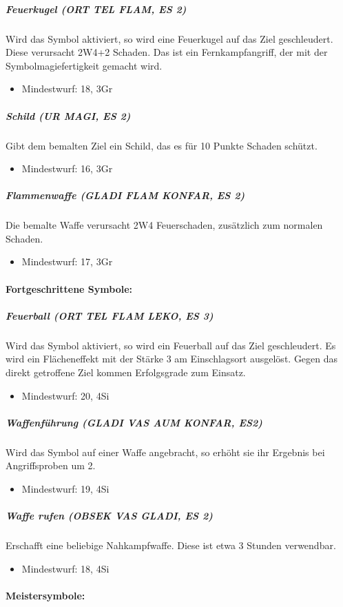 \documentclass{article}
\begin{document}
\subparagraph{Feuerkugel (ORT TEL FLAM, ES 2)}
Wird das Symbol aktiviert, so wird eine Feuerkugel auf das Ziel geschleudert. Diese verursacht 2W4+2 Schaden. Das ist ein Fernkampfangriff, der mit der Symbolmagiefertigkeit gemacht wird.
\begin{itemize}
\item Mindestwurf: 18, 3Gr
\end{itemize}

\subparagraph{Schild (UR MAGI, ES 2)}
Gibt dem bemalten Ziel ein Schild, das es für 10 Punkte Schaden schützt.
\begin{itemize}
\item Mindestwurf: 16, 3Gr
\end{itemize}

\subparagraph{Flammenwaffe (GLADI FLAM KONFAR, ES 2)}
Die bemalte Waffe verursacht 2W4 Feuerschaden, zusätzlich zum normalen Schaden.
\begin{itemize}
\item Mindestwurf: 17, 3Gr
\end{itemize}

\paragraph{Fortgeschrittene Symbole:}

\subparagraph{Feuerball (ORT TEL FLAM LEKO, ES 3)}
Wird das Symbol aktiviert, so wird ein Feuerball auf das Ziel geschleudert. Es wird ein Flächeneffekt mit der Stärke 3 am Einschlagsort ausgelöst. Gegen das direkt getroffene Ziel kommen Erfolgsgrade zum Einsatz.
\begin{itemize}
\item Mindestwurf: 20, 4Si
\end{itemize}

\subparagraph{Waffenführung (GLADI VAS AUM KONFAR, ES2)}
Wird das Symbol auf einer Waffe angebracht, so erhöht sie ihr Ergebnis bei Angriffsproben um 2.
\begin{itemize}
\item Mindestwurf: 19, 4Si
\end{itemize}

\subparagraph{Waffe rufen (OBSEK VAS GLADI, ES 2)}
Erschafft eine beliebige Nahkampfwaffe. Diese ist etwa 3 Stunden verwendbar.
\begin{itemize}
\item Mindestwurf: 18, 4Si
\end{itemize}

\paragraph{Meistersymbole:}
\end{document}
